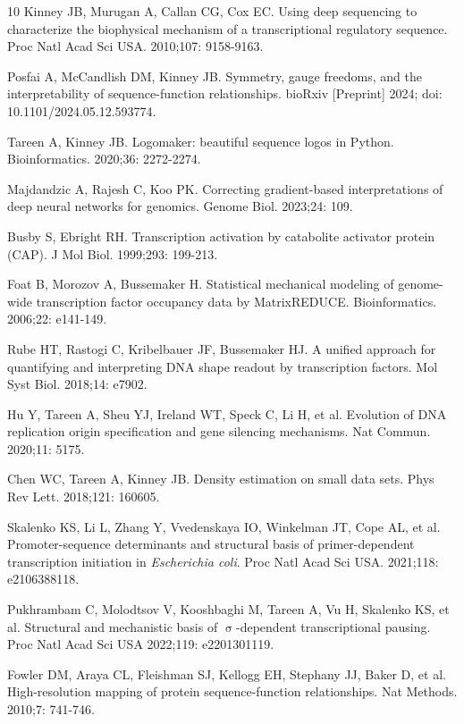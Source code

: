 \documentclass[10pt,letterpaper]{article}
\begin{document}
\begin{thebibliography}{10}
 Kinney JB, Murugan A, Callan CG, Cox EC. Using deep sequencing to characterize the biophysical mechanism of a transcriptional regulatory sequence. Proc Natl Acad Sci USA. 2010;107: 9158-9163. 

 Posfai A, McCandlish DM, Kinney JB. Symmetry, gauge freedoms, and the interpretability of sequence-function relationships. bioRxiv [Preprint] 2024; doi: 10.1101/2024.05.12.593774. %

 Tareen A, Kinney JB. Logomaker: beautiful sequence logos in Python. Bioinformatics. 2020;36: 2272-2274.

 Majdandzic A, Rajesh C, Koo PK. Correcting gradient-based interpretations of deep neural networks for genomics. Genome Biol. 2023;24: 109.

 Busby S, Ebright RH. Transcription activation by catabolite activator protein (CAP). J Mol Biol. 1999;293: 199-213. 

 Foat B, Morozov A, Bussemaker H. Statistical mechanical modeling of genome-wide transcription factor occupancy data by MatrixREDUCE. Bioinformatics. 2006;22: e141-149. 

 Rube HT, Rastogi C, Kribelbauer JF, Bussemaker HJ. A unified approach for quantifying and interpreting DNA shape readout by transcription factors. Mol Syst Biol. 2018;14: e7902. 

 Hu Y, Tareen A, Sheu YJ, Ireland WT, Speck C, Li H, et al. Evolution of DNA replication origin specification and gene silencing mechanisms. Nat Commun. 2020;11: 5175. 

 Chen WC, Tareen A, Kinney JB. Density estimation on small data sets. Phys Rev Lett. 2018;121: 160605.

 Skalenko KS, Li L, Zhang Y, Vvedenskaya IO, Winkelman JT, Cope AL, et al. Promoter-sequence determinants and structural basis of primer-dependent transcription initiation in \textit{Escherichia coli}. Proc Natl Acad Sci USA. 2021;118: e2106388118. 

 Pukhrambam C, Molodtsov V, Kooshbaghi M, Tareen A, Vu H, Skalenko KS, et al. Structural and mechanistic basis of $\upsigma$-dependent transcriptional pausing. Proc Natl Acad Sci USA 2022;119: e2201301119.

 Fowler DM, Araya CL, Fleishman SJ, Kellogg EH, Stephany JJ, Baker D, et al. High-resolution mapping of protein sequence-function relationships. Nat Methods. 2010;7: 741-746.


\end{thebibliography}
\end{document}
